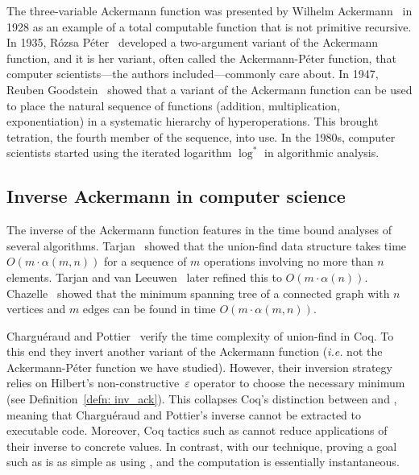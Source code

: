 The three-variable Ackermann function was presented by Wilhelm Ackermann~\cite{ackermann} in 1928 as an example of a total computable function that is not primitive recursive.
In 1935, Rózsa Péter~\cite{peter} developed a two-argument variant of the Ackermann 
function, and it is her variant, often called the Ackermann-Péter function,
that computer scientists---the authors included---commonly care about.
In 1947, Reuben Goodstein~\cite{goodstein} showed that a variant of the Ackermann function 
can be used to place the natural sequence of functions (addition, multiplication,
exponentiation) in a systematic hierarchy of hyperoperations. 
This brought tetration, the fourth member of the sequence, into use.
In the 1980s, computer scientists started using the
iterated logarithm $\log^*$ in algorithmic analysis.

\subsection{Inverse Ackermann in computer science}

The inverse of the Ackermann function
features in the time bound analyses of several algorithms.
Tarjan~\cite{tarjan} showed that the union-find data structure
takes time \mbox{$O(m\cdot\alpha(m,n))$} for a sequence of $m$ operations
involving no more than $n$ elements.
Tarjan and van Leeuwen~\cite{tarjan2} later refined this to $O(m\cdot\alpha(n))$.
Chazelle~\cite{chazelle} showed that the minimum spanning tree
of a connected graph with $n$ vertices and $m$ edges
can be found in time $O(m\cdot\alpha(m,n))$.

Chargu\'eraud and Pottier~\cite{charpott}
verify the time complexity of union-find in Coq.
To this end they invert another variant of the Ackermann function 
(\emph{i.e.} not the Ackermann-Péter function we have 
studied). 
However, their inversion strategy 
relies on Hilbert's non-constructive~$\varepsilon$ operator 
to choose the necessary minimum (see Definition~\ref{defn: inv_ack}). 
This collapses Coq's distinction between  and , meaning that
Chargu\'eraud and Pottier's 
inverse cannot be extracted to executable code.  Moreover, 
Coq tactics such as  cannot reduce applications of
their inverse to concrete values.  In contrast, with our technique,
proving a goal such as  is as simple as 
using , and the computation is essentially instantaneous.

